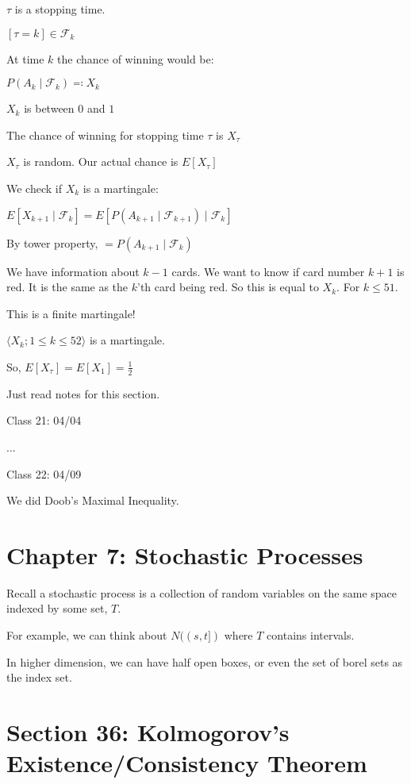 \documentclass{article}
\theoremstyle{definition}
\begin{document}
\(\tau\) is a stopping time.

\([\tau = k] \in \mathscr{F}_k\)

At time \(k\) the chance of winning would be:

\(P(A_k \mid \mathscr{F}_k)\eqqcolon X_k\) 

\(X_k\) is between \(0\) and \(1\)

The chance of winning for stopping time \(\tau\) is \(X_\tau\) 

\(X_\tau\) is random. Our actual chance is \(E[X_\tau]\) 

We check if \(X_k\) is a martingale:

\(E[X_{k+1}\mid \mathscr{F}_k] = E[P(A_{k+1}\mid \mathscr{F}_{k+1})\mid \mathscr{F}_k]\)

By tower property, \(=P(A_{k+1}\mid \mathscr{F}_k)\) 

We have information about \(k-1\) cards. We want to know if card number \(k+1\) is red. It is the same as the \(k\)'th card being red. So this is equal to \(X_k\). For \(k \leq 51\). 

This is a finite martingale!

\(\langle X_k ; 1 \leq k \leq 52 \rangle \) is a martingale.

So, \(E[X_\tau]=E[X_1]=\frac{1}{2}\) 

Just read notes for this section.

\hrulefill

Class 21: 04/04

...

Class 22: 04/09

We did Doob's Maximal Inequality.

\section*{Chapter 7: Stochastic Processes}

Recall a stochastic process is a collection of random variables on the same space indexed by some set, \(T\).

For example, we can think about \(N((s,t])\) where \(T\) contains intervals.

In higher dimension, we can have half open boxes, or even the set of borel sets as the index set.

\section*{Section 36: Kolmogorov's Existence/Consistency Theorem}
\end{document}
